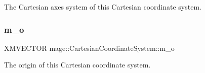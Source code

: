 The Cartesian axes system of this Cartesian coordinate system. \hypertarget{structmage_1_1_cartesian_coordinate_system_a1ea373bb91be991ee221a2ce1e02be2b}{}\label{structmage_1_1_cartesian_coordinate_system_a1ea373bb91be991ee221a2ce1e02be2b} 
\subsubsection{\texorpdfstring{m\+\_\+o}{m\_o}}
{\footnotesize\ttfamily X\+M\+V\+E\+C\+T\+OR mage\+::\+Cartesian\+Coordinate\+System\+::m\+\_\+o\hspace{0.3cm}{\ttfamily [private]}}

The origin of this Cartesian coordinate system. 
